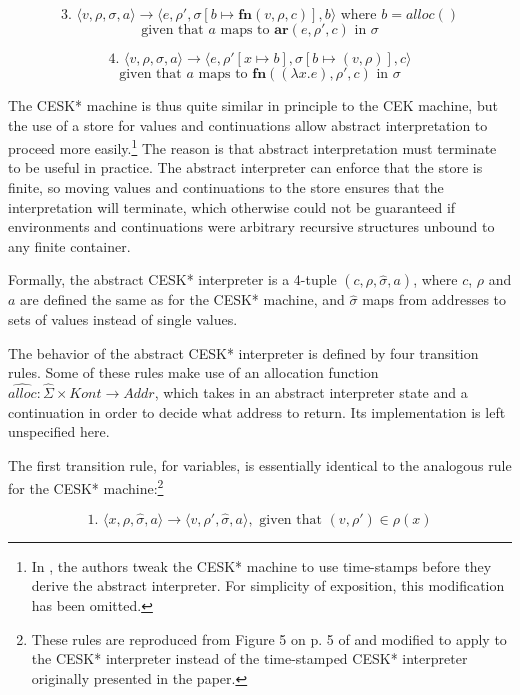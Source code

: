 \documentclass{article}
\begin{document}
$$
\text{3. }
\langle v, \rho, \sigma, a \rangle
\to
\langle e, \rho', \sigma[b \mapsto \textbf{fn}(v, \rho, c)], b \rangle
\text{ where $b = alloc()$}
$$
$$
\text{given that $a$ maps to $\textbf{ar}(e, \rho', c)$ in $\sigma$}
$$

$$
\text{4. }
\langle v, \rho, \sigma, a \rangle
\to
\langle e, \rho'[x \mapsto b], \sigma[b \mapsto (v, \rho)], c \rangle
$$
$$
\text{given that $a$ maps to $\textbf{fn}((\lambda x.e), \rho', c)$ in $\sigma$}
$$

The CESK* machine is thus quite similar in principle to the CEK machine, but the use of a store for values and continuations allow abstract interpretation to proceed more easily.\footnote{In \cite{aam}, the authors tweak the CESK* machine to use time-stamps before they derive the abstract interpreter. For simplicity of exposition, this modification has been omitted.} The reason is that abstract interpretation must terminate to be useful in practice. The abstract interpreter can enforce that the store is finite, so moving values and continuations to the store ensures that the interpretation will terminate, which otherwise could not be guaranteed if environments and continuations were arbitrary recursive structures unbound to any finite container.

Formally, the abstract CESK* interpreter is a 4-tuple $(c, \rho, \hat{\sigma}, a)$, where $c$, $\rho$ and $a$ are defined the same as for the CESK* machine, and $\hat{\sigma}$ maps from addresses to sets of values instead of single values.

The behavior of the abstract CESK* interpreter is defined by four transition rules. Some of these rules make use of an allocation function $\widehat{alloc} : \hat{\Sigma} \times Kont \to Addr$, which takes in an abstract interpreter state and a continuation in order to decide what address to return. Its implementation is left unspecified here.

The first transition rule, for variables, is essentially identical to the analogous rule for the CESK* machine:\footnote{These rules are reproduced from Figure 5 on p. 5 of \cite{aam} and modified to apply to the CESK* interpreter instead of the time-stamped CESK* interpreter originally presented in the paper.}

$$
\text{1. }
\langle x, \rho, \hat{\sigma}, a \rangle
\to
\langle v, \rho', \hat{\sigma}, a \rangle,
\text{ given that $(v, \rho') \in \rho(x)$}
$$
\end{document}

